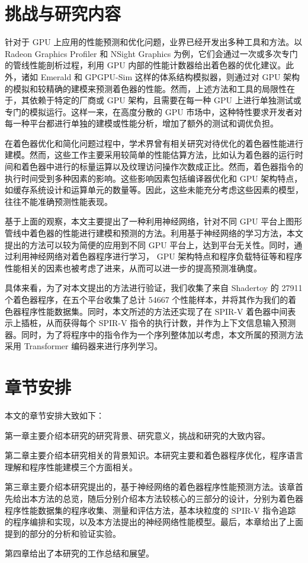 \section{挑战与研究内容}

针对于 GPU 上应用的性能预测和优化问题，业界已经开发出多种工具和方法。以 Radeon Graphics Profiler\cite{AMDRGP} 和 NSight Graphics\cite{NSightGraphics} 为例，它们会通过一次或多次专门的管线性能剖析过程，利用 GPU 内部的性能计数器给出着色器的优化建议。此外，诸如 Emerald 和 GPGPU-Sim 这样的体系结构模拟器，则通过对 GPU 架构的模拟和较精确的建模来预测着色器的性能。然而，上述方法和工具的局限性在于，其依赖于特定的厂商或 GPU 架构，且需要在每一种 GPU 上进行单独测试或专门的模拟运行。这样一来，在高度分散的 GPU 市场中，这种特性要求开发者对每一种平台都进行单独的建模或性能分析，增加了额外的测试和调优负担。

在着色器优化和简化问题过程中，学术界曾有相关研究对待优化的着色器性能进行建模。然而，这些工作主要采用较简单的性能估算方法，比如认为着色器的运行时间和着色器中进行的标量运算以及纹理访问操作次数成正比。然而，着色器指令的执行时间受到多种因素的影响。这些影响因素包括编译器优化和 GPU 架构特点，如缓存系统设计和运算单元的数量等。因此，这些未能充分考虑这些因素的模型，往往不能准确预测性能表现。

基于上面的观察，本文主要提出了一种利用神经网络，针对不同 GPU 平台上图形管线中着色器的性能进行建模和预测的方法。利用基于神经网络的学习方法，本文提出的方法可以较为简便的应用到不同 GPU 平台上，达到平台无关性。同时，通过利用神经网络对着色器程序进行学习， GPU 架构特点和程序负载特征等和程序性能相关的因素也被考虑了进来，从而可以进一步的提高预测准确度。

具体来看，为了对本文提出的方法进行验证，我们收集了来自 Shadertoy 的 27911 个着色器程序，在五个平台收集了总计 54667 个性能样本，并将其作为我们的着色器程序性能数据集。同时，本文所述的方法还实现了在 SPIR-V 着色器中间表示上插桩，从而获得每个 SPIR-V 指令的执行计数，并作为上下文信息输入预测器。同时，为了将程序中的指令作为一个序列整体加以考虑，本文所属的预测方法采用 Transformer 编码器来进行序列学习。

\section{章节安排}

本文的章节安排大致如下：

第一章主要介绍本研究的研究背景、研究意义，挑战和研究的大致内容。

第二章主要介绍本研究相关的背景知识。本研究主要和着色器程序优化，程序语言理解和程序性能建模三个方面相关。

第三章主要介绍本研究提出的，基于神经网络的着色器程序性能预测方法。该章首先给出本方法的总览，随后分别介绍本方法较核心的三部分的设计，分别为着色器程序性能数据集的程序收集、测量和评估方法，基本块粒度的 SPIR-V 指令追踪的程序编排和实现，以及本方法提出的神经网络性能模型。最后，本章给出了上面提到的部分的分析和验证实验。

第四章给出了本研究的工作总结和展望。